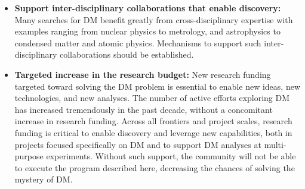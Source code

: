 \documentclass[nofootinbib]{article}
\newcommand{\jyc}[1]{\textbf{\textcolor{red}{(#1 --jy)}}}
\begin{document}
\begin{itemize}
\item \textbf{Support inter-disciplinary collaborations that enable discovery:}
Many searches for DM benefit greatly from cross-disciplinary expertise with examples ranging from nuclear physics to metrology, and astrophysics to condensed matter and atomic physics. Mechanisms to support such inter-disciplinary collaborations should be established.



\item\textbf{Targeted increase in the research budget:} 
New research funding targeted toward solving the DM problem is essential to enable new ideas, new technologies, and new analyses. The number of active efforts exploring DM has increased tremendously in the past decade, without a concomitant increase in research funding. %
Across all frontiers and project scales, research funding is critical to enable discovery and leverage new capabilities, both in projects focused specifically on DM and to support DM analyses at multi-purpose experiments.
Without such support, the community will not be able to execute the program described here, decreasing the chances of solving the mystery of DM. 







\end{itemize}
\end{document}
